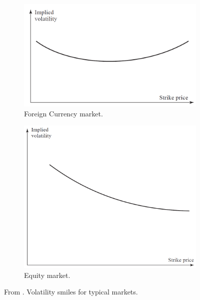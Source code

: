 \documentclass[12,twoside]{mammeTFM}
\theoremstyle{definition}
\theoremstyle{remark}
\begin{document}
\begin{figure}
\centering
\begin{subfigure}{.5\textwidth}
  \centering
  \includegraphics[width=.9\linewidth]{Media/currency_smile.PNG}
  \caption{Foreign Currency market.}
\end{subfigure}%
\begin{subfigure}{.5\textwidth}
  \centering
  \includegraphics[width=.65\linewidth]{Media/equity_smile.PNG}
  \caption{Equity market.}
\end{subfigure}
\caption{From \cite{hul09}. Volatility smiles for typical markets.}
\label{fig:smile}
\end{figure}
\end{document}

